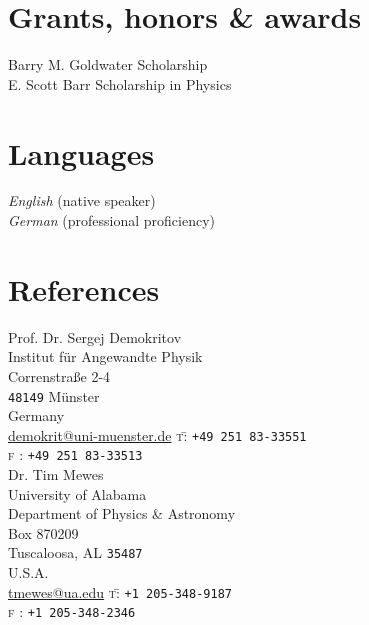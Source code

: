 \documentclass[svgnames, 10pt, a4paper]{article}
\newcommand{\years}[1]{\marginnote{\scriptsize #1}}
\newenvironment{nstabbing}
  {\setlength{\topsep}{0pt}%
   \setlength{\partopsep}{0pt}%
   \tabbing}
  {\endtabbing}
\begin{document}
\section*{Grants, honors \& awards}
\noindent
\years{2008}Barry M. Goldwater Scholarship\\
\years{2005}E. Scott Barr Scholarship in Physics

\section*{Languages}
\emph{English} (native speaker)\\
\emph{German} (professional proficiency)

\section*{References}
\noindent
Prof. Dr. Sergej Demokritov\\
Institut für Angewandte Physik\\
Correnstraße 2-4\\
\texttt{48149} Münster\\
Germany\\
\href{mailto:demokrit@uni-muenster.de}{demokrit@uni-muenster.de}
\begin{nstabbing}
\textsc{t}\= : \texttt{+49 251 83-33551}\\
\textsc{f}\> : \texttt{+49 251 83-33513}\\[.2cm]
\end{nstabbing}
\noindent
Dr. Tim Mewes\\
University of Alabama\\
Department of Physics \& Astronomy\\
Box 870209\\
Tuscaloosa, AL \texttt{35487}\\
U.S.A.\\
\href{mailto:tmewes@ua.edu}{tmewes@ua.edu}
\begin{nstabbing}
\textsc{t}\= : \texttt{+1 205-348-9187}\\
\textsc{f}\> : \texttt{+1 205-348-2346}
\end{nstabbing}


\end{document}

